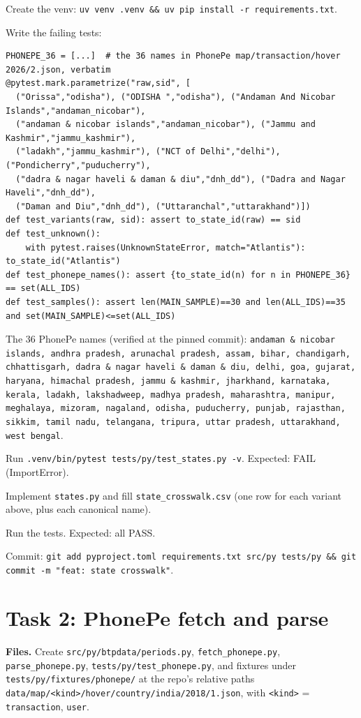 \documentclass[10pt,a4paper]{article}
\newcommand{\f}[1]{\texttt{#1}}
\begin{document}
\begin{steps}
\item Create the venv: \f{uv venv .venv \&\& uv pip install -r requirements.txt}.
\item Write the failing tests:
\begin{verbatim}
PHONEPE_36 = [...]  # the 36 names in PhonePe map/transaction/hover 2026/2.json, verbatim
@pytest.mark.parametrize("raw,sid", [
  ("Orissa","odisha"), ("ODISHA ","odisha"), ("Andaman And Nicobar Islands","andaman_nicobar"),
  ("andaman & nicobar islands","andaman_nicobar"), ("Jammu and Kashmir","jammu_kashmir"),
  ("ladakh","jammu_kashmir"), ("NCT of Delhi","delhi"), ("Pondicherry","puducherry"),
  ("dadra & nagar haveli & daman & diu","dnh_dd"), ("Dadra and Nagar Haveli","dnh_dd"),
  ("Daman and Diu","dnh_dd"), ("Uttaranchal","uttarakhand")])
def test_variants(raw, sid): assert to_state_id(raw) == sid
def test_unknown():
    with pytest.raises(UnknownStateError, match="Atlantis"): to_state_id("Atlantis")
def test_phonepe_names(): assert {to_state_id(n) for n in PHONEPE_36} == set(ALL_IDS)
def test_samples(): assert len(MAIN_SAMPLE)==30 and len(ALL_IDS)==35 and set(MAIN_SAMPLE)<=set(ALL_IDS)
\end{verbatim}
      The 36 PhonePe names (verified at the pinned commit): \f{andaman \& nicobar islands, andhra pradesh,
      arunachal pradesh, assam, bihar, chandigarh, chhattisgarh, dadra \& nagar haveli \& daman \& diu, delhi, goa,
      gujarat, haryana, himachal pradesh, jammu \& kashmir, jharkhand, karnataka, kerala, ladakh, lakshadweep,
      madhya pradesh, maharashtra, manipur, meghalaya, mizoram, nagaland, odisha, puducherry, punjab, rajasthan,
      sikkim, tamil nadu, telangana, tripura, uttar pradesh, uttarakhand, west bengal}.
\item Run \f{.venv/bin/pytest tests/py/test\_states.py -v}. Expected: FAIL (ImportError).
\item Implement \f{states.py} and fill \f{state\_crosswalk.csv} (one row for each variant above, plus each canonical name).
\item Run the tests. Expected: all PASS.
\item Commit: \f{git add pyproject.toml requirements.txt src/py tests/py \&\& git commit -m "feat: state crosswalk"}.
\end{steps}

\section{Task 2: PhonePe fetch and parse}
\textbf{Files.} Create \f{src/py/btpdata/periods.py}, \f{fetch\_phonepe.py}, \f{parse\_phonepe.py},
\f{tests/py/test\_phonepe.py}, and fixtures under \f{tests/py/fixtures/phonepe/} at the repo's relative
paths \f{data/map/<kind>/hover/country/india/2018/1.json}, with \f{<kind>} = \f{transaction}, \f{user}.
\end{document}
